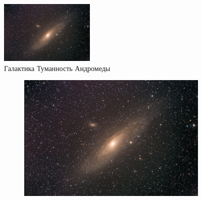 \documentclass[10pt]{article}
\author{}
\date{}
\begin{document}
	\begin{figure}
			    \centering
			    \includegraphics[width = 0.4\textwidth]{img/galaxy}
			\caption{Галактика Туманность Андромеды}
			\end{figure}
	
	\begin{figure}
				\centering
				\begin{subfigure}[b]{0.3\textwidth}
					\centering
					\includegraphics[width = \textwidth]{img/galaxy}
					\caption{}
				\end{subfigure}
				\begin{subfigure}[b]{0.3\textwidth}
					\centering

\end{subfigure}
\end{figure}
\end{document}
